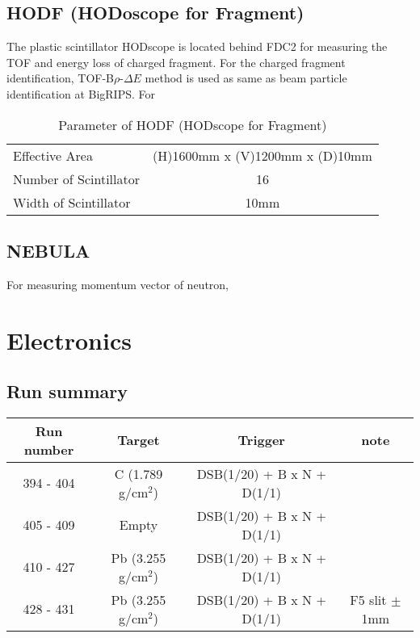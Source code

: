 \subsection{HODF (HODoscope for Fragment)}
The plastic scintillator HODscope is located behind FDC2 for measuring the TOF and energy loss of charged fragment. For the charged fragment identification, TOF-B$\rho$-$\Delta E$ method is used as same as beam particle identification at BigRIPS. For 
\begin{table}[h]
    \centering
    \begin{tabular}{l|c}
        \hline
        Effective Area & (H)1600mm x (V)1200mm x (D)10mm\\
        Number of Scintillator & 16 \\
        Width of Scintillator & 10mm \\
        \hline
    \end{tabular}
    \caption{Parameter of HODF (HODscope for Fragment) \cite{SAMURAI}}
\end{table}

\subsection{NEBULA}
For measuring momentum vector of neutron, 

\section{Electronics}
\subsection{Run summary}
\begin{center}
    \begin{tabular}[h]{c|ccc}
        \hline
        Run number& Target & Trigger & note\\
        \hline
        394 - 404 &  C (1.789 g/cm${}^{2}$)  & DSB(1/20) + B x N + D(1/1) &\\
        405 - 409 &  Empty  & DSB(1/20) + B x N + D(1/1) &\\
        410 - 427 &  Pb (3.255 g/cm${}^{2}$)  & DSB(1/20) + B x N + D(1/1) &\\
        428 - 431 & Pb (3.255 g/cm${}^{2}$)  & DSB(1/20) + B x N + D(1/1) & F5 slit $\pm$1mm \\
        \hline
    \end{tabular}
\end{center}

